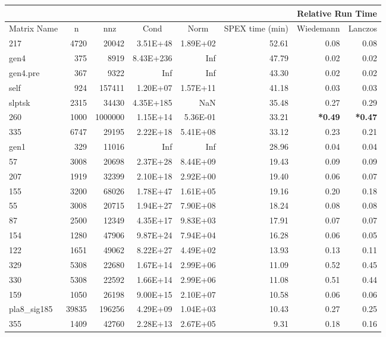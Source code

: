 \documentclass[10pt]{article}
\newcommand{\red}{
	\color{red}	
	}
\begin{document}
\begin{longtable}{|l|r|r|r|r|r|r|r|}
\hline	
& & & & & & \multicolumn{2}{c|}{Relative Run Time}  \\ \hline
\multicolumn{1}{|c|}{Matrix Name}	& \multicolumn{1}{c|}{n} & \multicolumn{1}{c|}{nnz} & \multicolumn{1}{c|}{Cond} & \multicolumn{1}{c|}{Norm}  & \multicolumn{1}{c|}{SPEX time (min)} & \multicolumn{1}{c|}{Wiedemann} & \multicolumn{1}{c|}{Lanczos} \\  \hline \endhead
217	&	4720	&	20042	&	3.51E+48	&	1.89E+02	&	52.61	&	0.08	&	0.08	\\
gen4	&	375	&	8919	&	8.43E+236	&	Inf	&	47.79	&	0.02	&	0.02	\\
gen4.pre	&	367	&	9322	&	Inf	&	Inf	&	43.30	&	0.02	&	0.02	\\
self	&	924	&	157411	&	1.20E+07	&	1.57E+11	&	41.18	&	0.03	&	0.03	\\
slptsk	&	2315	&	34430	&	4.35E+185	&	NaN	&	35.48	&	0.27	&	0.29	\\
260	&	1000	&	1000000	&	1.15E+14	&	5.36E-01	&	33.21	&	{\bf \red *0.49}	&	{\bf \red *0.47}	\\
335	&	6747	&	29195	&	2.22E+18	&	5.41E+08	&	33.12	&	0.23	&	0.21	\\
gen1	&	329	&	11016	&	Inf	&	Inf	&	28.96	&	0.04	&	0.04	\\
57	&	3008	&	20698	&	2.37E+28	&	8.44E+09	&	19.43	&	0.09	&	0.09	\\
207	&	1919	&	32399	&	2.10E+18	&	2.92E+00	&	19.40	&	0.06	&	0.07	\\
155	&	3200	&	68026	&	1.78E+47	&	1.61E+05	&	19.16	&	0.20	&	0.18	\\
55	&	3008	&	20715	&	1.94E+27	&	7.90E+08	&	18.24	&	0.08	&	0.08	\\
87	&	2500	&	12349	&	4.35E+17	&	9.83E+03	&	17.91	&	0.07	&	0.07	\\
154	&	1280	&	47906	&	9.87E+24	&	7.94E+04	&	16.28	&	0.06	&	0.05	\\
122	&	1651	&	49062	&	8.22E+27	&	4.49E+02	&	13.93	&	0.13	&	0.11	\\
329	&	5308	&	22680	&	1.67E+14	&	2.99E+06	&	11.09	&	0.52	&	0.45	\\
330	&	5308	&	22592	&	1.66E+14	&	2.99E+06	&	11.08	&	0.51	&	0.44	\\
159	&	1050	&	26198	&	9.00E+15	&	2.10E+07	&	10.58	&	0.06	&	0.06	\\
pla8\_sig185	&	39835	&	196256	&	4.29E+09	&	1.04E+03	&	10.43	&	0.27	&	0.25	\\
355	&	1409	&	42760	&	2.28E+13	&	2.67E+05	&	9.31	&	0.18	&	0.16	\\

\end{longtable}
\end{document}
